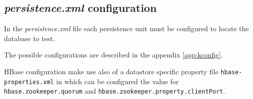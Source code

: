 \subsection{\textit{persistence.xml} configuration}
In the \textit{persistence.xml} file each persistence unit must be configured to locate the database to test.

\noindent The possible configurations are described in the appendix \ref{app:kconfig}.

\noindent HBase configuration make use also of a datastore specific property file \texttt{hbase-properties.xml} in which can be configured the value for \texttt{hbase.zookeeper.quorum} and \texttt{hbase.zookeeper.property.clientPort}.